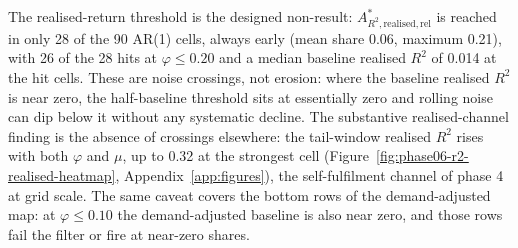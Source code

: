 \documentclass[12pt]{article}
\begin{document}
The realised-return threshold is the designed non-result: $A^{*}_{R^{2},\mathrm{realised},\mathrm{rel}}$ is reached in only 28 of the 90 AR(1) cells, always early (mean share 0.06, maximum 0.21), with 26 of the 28 hits at $\varphi\leq0.20$ and a median baseline realised $R^{2}$ of 0.014 at the hit cells. %
These are noise crossings, not erosion: where the baseline realised $R^{2}$ is near zero, the half-baseline threshold sits at essentially zero and rolling noise can dip below it without any systematic decline. The substantive realised-channel finding is the absence of crossings elsewhere: the tail-window realised $R^{2}$ rises with both $\varphi$ and $\mu$, up to 0.32 at the strongest cell (Figure~\ref{fig:phase06-r2-realised-heatmap}, Appendix~\ref{app:figures}), the self-fulfilment channel of phase 4 at grid scale. %
The same caveat covers the bottom rows of the demand-adjusted map: at $\varphi\leq0.10$ the demand-adjusted baseline is also near zero, and those rows fail the filter or fire at near-zero shares. %
\end{document}
